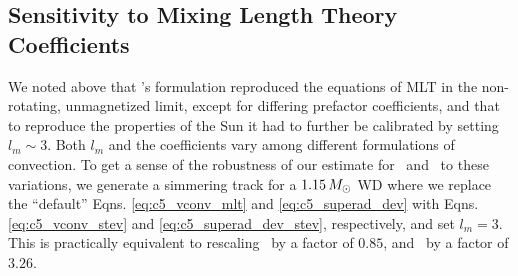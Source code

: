 


\subsection{Sensitivity to Mixing Length Theory Coefficients}
\label{ssec:c5_sensitive_apdx}

We noted above that \citeal{stev79}'s formulation reproduced the equations of MLT in the non-rotating, unmagnetized limit, except for differing prefactor coefficients, and that to reproduce the properties of the Sun it had to further be calibrated by setting $l_m \sim 3$.  Both $l_m$ and the coefficients vary among different formulations of convection.  To get a sense of the robustness of our estimate for \Mcrit\ and \MNi\ to these variations, we generate a simmering track for a $1.15\,\Msun$ WD where we replace the ``default'' Eqns. \ref{eq:c5_vconv_mlt} and \ref{eq:c5_superad_dev} with Eqns. \ref{eq:c5_vconv_stev} and \ref{eq:c5_superad_dev_stev}, respectively, and set $l_m = 3$.  This is practically equivalent to rescaling \vconv\ by a factor of $0.85$, and \dnabconv\ by a factor of $3.26$.

